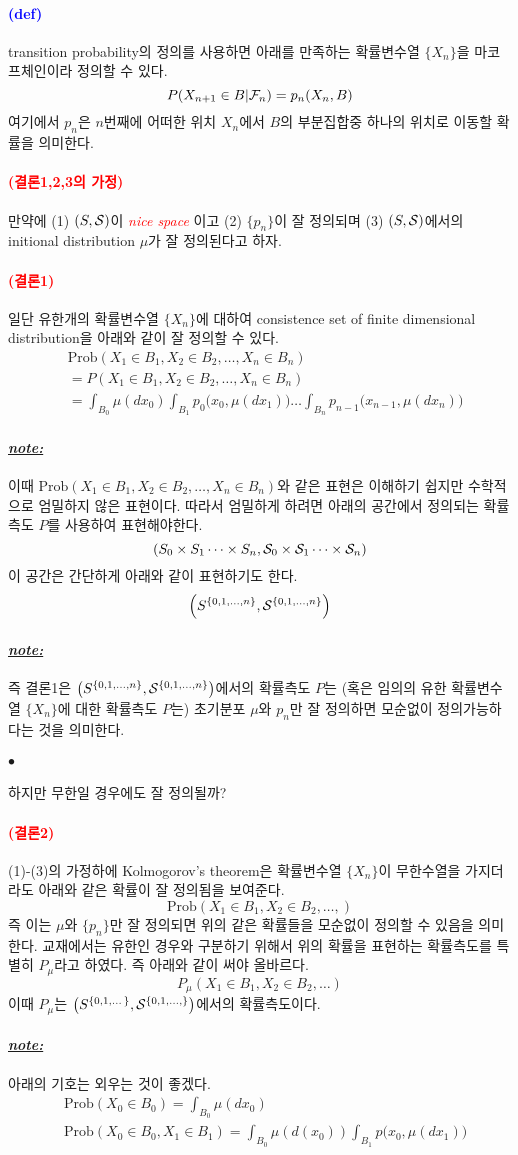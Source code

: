 \documentclass[12pt,oneside,english]{book}
\def\ck{\paragraph{\Large$\bullet$}\Large}
\def\note{\paragraph{\Large\textit{\underline{note:}}}\Large}
\newcommand{\parablue}[1]{\paragraph{\Large\textcolor{blue}{(#1)}}\Large}
\newcommand{\parared}[1]{\paragraph{\Large\textcolor{red}{(#1)}}\Large}
\begin{document}
\parablue{def} transition probability의 정의를 사용하면 아래를 만족하는 확률변수열 $\{X_n\}$을 마코프체인이라 정의할 수 있다. 
\[
P(X_{n+1}\in B|{\cal F}_n)=p_n(X_n,B)
\]
여기에서 $p_n$은 $n$번째에 어떠한 위치 $X_n$에서 $B$의 부분집합중 하나의 위치로 이동할 확률을 의미한다. 

\parared{결론1,2,3의 가정} 만약에 (1) $(S,{\cal S})$이 \textcolor{red}{\emph{nice space}} 이고 (2) $\{p_n\}$이 잘 정의되며 (3) $(S,{\cal S})$에서의 initional distribution $\mu$가 잘 정의된다고 하자. 

\parared{결론1} 일단 유한개의 확률변수열 $\{X_n\}$에 대하여 consistence set of finite dimensional distribution을 아래와 같이 잘 정의할 수 있다. 
\begin{align*}
& \mbox{Prob}(X_1\in B_1, X_2\in B_2, \dots, X_n \in B_n)\\
& = P(X_1\in B_1, X_2\in B_2, \dots, X_n \in B_n)\\
& = \int_{B_0}\mu(dx_0)\int_{B_1}p_0\big(x_0,\mu(dx_1)\big)\dots\int_{B_n}p_{n-1}\big(x_{n-1},\mu(dx_n)\big)
\end{align*}
\note 이때 $\mbox{Prob}(X_1\in B_1, X_2\in B_2, \dots, X_n \in B_n)$와 같은 표현은 이해하기 쉽지만 수학적으로 엄밀하지 않은 표현이다. 따라서 엄밀하게 하려면 아래의 공간에서 정의되는 확률측도 $P$를 사용하여 표현해야한다. 
\[
(S_0\times S_1 \dots \times S_n, {\cal S}_0\times {\cal S}_1 \dots \times {\cal S}_n)
\]
이 공간은 간단하게 아래와 같이 표현하기도 한다. 
\[
\left(S^{\{0,1,\dots,n\}},{\cal S}^{\{0,1,\dots,n\}}\right)
\]

\note 즉 결론1은 $\left(S^{\{0,1,\dots,n\}},{\cal S}^{\{0,1,\dots,n\}}\right)$에서의 확률측도 $P$는 (혹은 임의의 유한 확률변수열 $\{X_n\}$에 대한 확률측도 $P$는) 초기분포 $\mu$와 $p_n$만 잘 정의하면 모순없이 정의가능하다는 것을 의미한다.

\ck 하지만 무한일 경우에도 잘 정의될까? 

\parared{결론2} (1)-(3)의 가정하에 Kolmogorov's theorem은 확률변수열 $\{X_n\}$이 무한수열을 가지더라도 아래와 같은 확률이 잘 정의됨을 보여준다. 
\[
\mbox{Prob}(X_1\in B_1, X_2\in B_2, \dots, )
\]
즉 이는 $\mu$와 $\{p_n\}$만 잘 정의되면 위의 같은 확률들을 모순없이 정의할 수 있음을 의미한다. 교재에서는 유한인 경우와 구분하기 위해서 위의 확률을 표현하는 확률측도를 특별히 $P_{\mu}$라고 하였다. 즉 아래와 같이 써야 올바르다. 
\[
P_{\mu}(X_1\in B_1, X_2\in B_2, \dots)
\]
이때 $P_{\mu}$는 $\left(S^{\{0,1,\dots\}},{\cal S}^{\{0,1,\dots,\}}\right)$에서의 확률측도이다. 

\note 아래의 기호는 외우는 것이 좋겠다. 
\begin{align*}
& \mbox{Prob}(X_0\in B_0)= \int_{B_0} \mu(dx_0)\\ 
& \mbox{Prob}(X_0\in B_0,X_1 \in B_1)= \int_{B_0} \mu(d(x_0)) \int_{B_1} p\big(x_0,\mu(dx_1)\big) \\ 
\end{align*}
\end{document}
